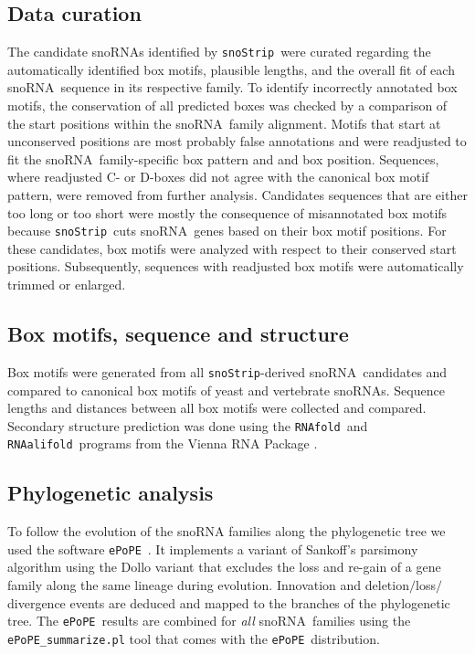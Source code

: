 \documentclass[preprint,3p,times,twocolumn]{elsarticle}
\newcommand{\sno}{snoRNA}
\newcommand{\snostrip}{\texttt{snoStrip}}
\newcommand{\epope}{\texttt{ePoPE}}
\newcommand{\fold}{\texttt{RNAfold}}
\newcommand{\alifold}{\texttt{RNAalifold}}
\begin{document}
\subsection{Data curation}

The candidate snoRNAs identified by \snostrip\ were curated regarding the
automatically identified box motifs, plausible lengths, and the overall fit
of each \sno\ sequence in its respective family. To identify incorrectly
annotated box motifs, the conservation of all predicted boxes was checked
by a comparison of the start positions within the \sno\ family
alignment. Motifs that start at unconserved positions are most probably
false annotations and were readjusted to fit the \sno\ family-specific box
pattern and and box position.  Sequences, where readjusted C- or D-boxes
did not agree with the canonical box motif pattern, were removed from further
analysis.
Candidates sequences that are either too long or too short were mostly
  the consequence of misannotated box motifs because \snostrip\ cuts \sno\
genes based on their box motif positions. For these candidates, box motifs
were analyzed with respect to their conserved start positions.
Subsequently, sequences with readjusted box motifs were automatically
trimmed or enlarged.

\subsection{Box motifs, sequence and structure}

Box motifs were generated from all \snostrip-derived \sno\ candidates
and compared to canonical box motifs of yeast and vertebrate snoRNAs.
Sequence lengths and distances between all box motifs were collected
and compared. Secondary structure prediction was done using the \fold\
and \alifold\ programs from the Vienna RNA
Package \cite{Hofacker:1994}.

\subsection{Phylogenetic analysis}

To follow the evolution of the snoRNA families along the phylogenetic
tree we used the software \epope\ \cite{Hertel:2015}.  It implements a
variant of Sankoff’s parsimony algorithm using the Dollo variant that
excludes the loss and re-gain of a gene family along the same lineage
during evolution.  Innovation and deletion$/$loss$/$divergence events
are deduced and mapped to the branches of the phylogenetic tree.  The
\epope\ results are combined for \emph{all} \sno\ families using the
\texttt{ePoPE\_summarize.pl} tool that comes with the \epope\
distribution.
\end{document}
